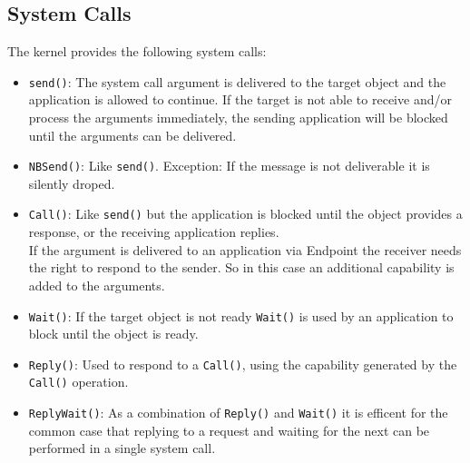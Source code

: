 \subsection{System Calls}
The kernel provides the following system calls:
\begin{itemize}
\item \texttt{send()}: The system call argument is delivered to the target object and the application is allowed to continue. If the target is not able to receive and/or process the arguments immediately, the sending application will be blocked until the arguments can be delivered.

\item \texttt{NBSend()}: Like \texttt{send()}. Exception: If the message is not deliverable it is silently droped.
\item \texttt{Call()}: Like \texttt{send()} but the application is blocked until the object provides a response, or the receiving application replies. \\
If the argument is delivered to an application via Endpoint the receiver needs the right to respond to the sender. So in this case an additional capability is added to the arguments. 
\item \texttt{Wait()}: If the target object is not ready \texttt{Wait()} is used by an application to block until the object is ready. 
\item \texttt{Reply()}: Used to respond to a \texttt{Call()}, using the capability generated by the \texttt{Call()} operation.
\item \texttt{ReplyWait()}: As a combination of \texttt{Reply()} and \texttt{Wait()} it is efficent for the common case that replying to a request and waiting for the next can be performed in a single system call. 
\end{itemize}
	
